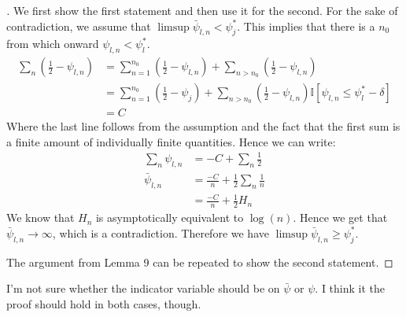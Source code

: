 \begin{proof}[]
    We first show the first statement and then use it for the second.
    For the sake of contradiction, we assume that $\limsup \bar{\psi}_{l, n} < \psi_j^*$. This implies that there is a $n_0$ from which onward $\psi_{l, n} < \psi_l^*$.
    \begin{align}
      \sum_n (\frac{1}{2} - \psi_{l, n}) &= \sum_{n=1}^{n_0} (\frac{1}{2} - \psi_{l, n}) + \sum_{n > n_0} (\frac{1}{2} - \psi_{l, n}) \\
        &= \sum_{n=1}^{n_0} (\frac{1}{2} - \psi_j) + \sum_{n > n_0} (\frac{1}{2} - \psi_{l, n})\mathbb{I}[\psi_{l, n} \leq \psi_l^* - \delta] \\
        &= C
    \end{align}
    Where the last line follows from the assumption and the fact that the first sum is a finite amount of individually finite quantities.
    Hence we can write:
    \begin{align}
      \sum_n \psi_{l, n} &= -C + \sum_n \frac{1}{2} \\
      \bar{\psi}_{l, n} &= \frac{-C}{n} + \frac{1}{2}\sum_n\frac{1}{n} \\
        &= \frac{-C}{n} + \frac{1}{2} H_n
    \end{align}
    We know that $H_n$ is asymptotically equivalent to $\log(n)$. Hence we get that $\bar{\psi}_{l, n} \rightarrow \infty$, which is a contradiction. Therefore we have $\limsup \bar{\psi}_{l, n} \geq \psi_j^*$.

    The argument from Lemma 9 can be repeated to show the second statement.
  \end{proof}

  \begin{remark}[Kevin 19/10/29]
    I'm not sure whether the indicator variable should be on $\bar{\psi}$ or $\psi$. I think it the proof should hold in both cases, though.
  \end{remark}

